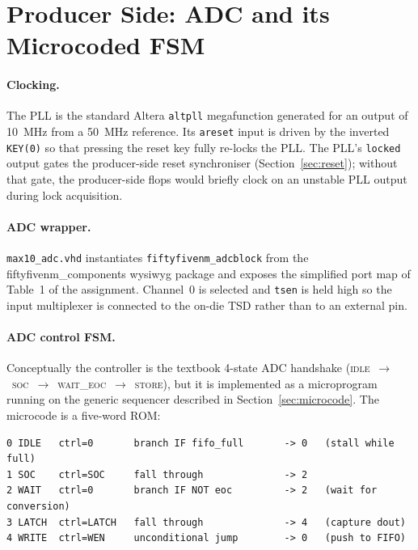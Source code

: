 \documentclass[12pt,letterpaper]{article}
\begin{document}
\section{Producer Side: ADC and its Microcoded FSM}
\label{sec:producer}

\paragraph{Clocking.}  The PLL is the standard Altera \texttt{altpll}
megafunction generated for an output of 10~MHz from a 50~MHz reference.  Its
\texttt{areset} input is driven by the inverted \texttt{KEY(0)} so that pressing
the reset key fully re-locks the PLL.  The PLL's \texttt{locked} output gates
the producer-side reset synchroniser (Section~\ref{sec:reset}); without that
gate, the producer-side flops would briefly clock on an unstable PLL output
during lock acquisition.

\paragraph{ADC wrapper.}  \texttt{max10\_adc.vhd} instantiates
\texttt{fiftyfivenm\_adcblock} from the \textsf{fiftyfivenm\_components}
\textsf{wysiwyg} package and exposes the simplified port map of
Table~1 of the assignment.  Channel~0 is selected and \texttt{tsen} is held
high so the input multiplexer is connected to the on-die TSD rather than to an
external pin.

\paragraph{ADC control FSM.}  Conceptually the controller is the textbook 4-state
ADC handshake \mbox{(\textsc{idle} $\rightarrow$ \textsc{soc} $\rightarrow$
\textsc{wait\_eoc} $\rightarrow$ \textsc{store})}, but it is
implemented as a microprogram running on the generic
sequencer described in Section~\ref{sec:microcode}.  The microcode is a
five-word ROM:

\begin{lstlisting}[caption={ADC microprogram (\texttt{adc\_fsm.vhd}).},label={lst:adc_uc}]
0 IDLE   ctrl=0       branch IF fifo_full       -> 0   (stall while full)
1 SOC    ctrl=SOC     fall through              -> 2
2 WAIT   ctrl=0       branch IF NOT eoc         -> 2   (wait for conversion)
3 LATCH  ctrl=LATCH   fall through              -> 4   (capture dout)
4 WRITE  ctrl=WEN     unconditional jump        -> 0   (push to FIFO)
\end{lstlisting}
\end{document}

